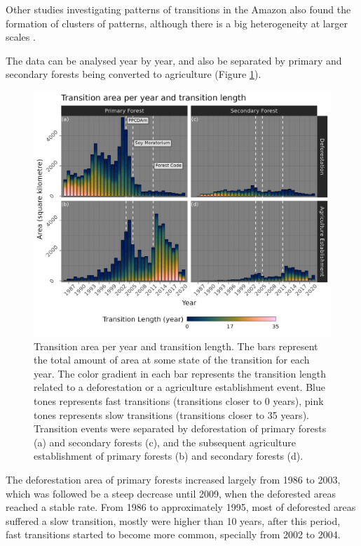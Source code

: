 \documentclass[essd, manuscript]{copernicus}
\begin{document}
Other studies investigating patterns of transitions in the Amazon also found the formation of clusters of patterns, although there is a big heterogeneity at larger scales \citep{MullerHansen2017}.

The data can be analysed year by year, and also be separated by primary and secondary forests being converted to agriculture (Figure \ref{fig:transbar-plot}).

\begin{figure}[ht]
\includegraphics[width=17cm]{figs/trans_length_cols} \caption{Transition area per year and transition length. The bars represent the total amount of area at some state of the transition for each year. The color gradient in each bar represents the transition length related to a deforestation or a agriculture establishment event. Blue tones represents fast transitions (transitions closer to 0 years), pink tones represents slow transitions (transitions closer to 35 years). Transition events were separated by deforestation of primary forests (a) and secondary forests (c), and the subsequent  agriculture establishment of primary forests (b) and secondary forests (d).}\label{fig:transbar-plot}
\end{figure}

The deforestation area of primary forests increased largely from 1986 to 2003, which was followed be a steep decrease until 2009, when the deforested areas reached a stable rate.
From 1986 to approximately 1995, most of deforested areas suffered a slow transition, mostly were higher than 10 years, after this period, fast transitions started to become more common, specially from 2002 to 2004.
\end{document}
